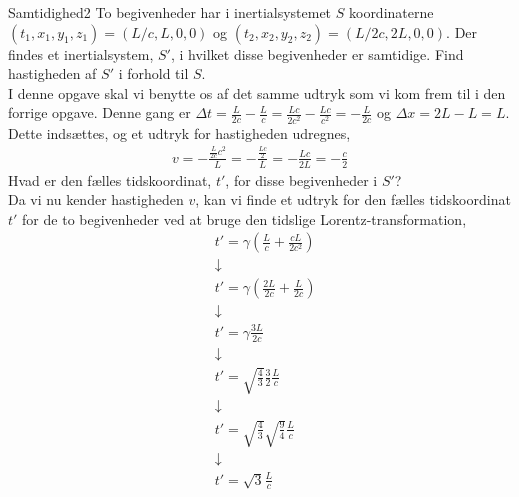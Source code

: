 \begin{opgave}{Samtidighed}{2}
	To begivenheder har i inertialsystemet $S$ koordinaterne $(t_1,x_1,y_1,z_1)=(L/c,L,0,0)$ og $(t_2,x_2,y_2,z_2)=(L/2c,2L,0,0)$.
	\opg Der findes et inertialsystem, $S'$, i hvilket disse begivenheder er samtidige. Find hastigheden af $S'$ i forhold til $S$.\\
	
	I denne opgave skal vi benytte os af det samme udtryk som vi kom frem til i den forrige opgave. Denne gang er $\Delta t=\frac{L}{2c}-\frac{L}{c}=\frac{Lc}{2c^2}-\frac{Lc}{c^2}=-\frac{L}{2c}$ og $\Delta x=2L-L=L$. Dette indsættes, og et udtryk for hastigheden udregnes,
	\begin{align*}
		v=-\frac{\frac{L}{2c}c^2}{L}=-\frac{\frac{Lc}{2}}{L}=-\frac{Lc}{2L}=-\frac{c}{2}
	\end{align*}
	\opg Hvad er den fælles tidskoordinat, $t'$, for disse begivenheder i $S'$?\\
	
	Da vi nu kender hastigheden $v$, kan vi finde et udtryk for den fælles tidskoordinat $t'$ for de to begivenheder ved at bruge den tidslige Lorentz-transformation,
	\begin{align*}
		&t'=\gamma(\frac{L}{c}+\frac{cL}{2c^2}) \\
		&\downarrow \\
		&t'=\gamma(\frac{2L}{2c}+\frac{L}{2c}) \\
		&\downarrow \\
		&t'=\gamma\frac{3L}{2c} \\
		&\downarrow \\
		&t'=\sqrt{\frac{4}{3}}\frac{3}{2}\frac{L}{c} \\
		&\downarrow \\
		&t'=\sqrt{\frac{4}{3}}\sqrt{\frac{9}{4}}\frac{L}{c} \\
		&\downarrow \\
		&t'=\sqrt{3}\frac{L}{c}
	\end{align*}
\end{opgave}

